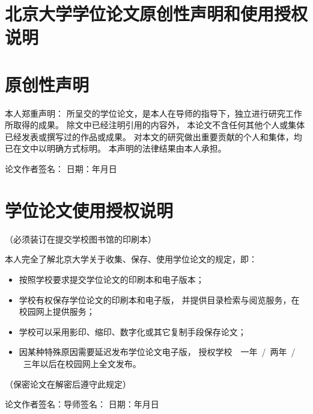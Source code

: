\cleardoublepage
\section*{北京大学学位论文原创性声明和使用授权说明}
\vfill

\section*{原创性声明}

本人郑重声明：
所呈交的学位论文，是本人在导师的指导下，独立进行研究工作所取得的成果。
除文中已经注明引用的内容外，
本论文不含任何其他个人或集体已经发表或撰写过的作品或成果。
对本文的研究做出重要贡献的个人和集体，均已在文中以明确方式标明。
本声明的法律结果由本人承担。
\vspace{2.5em}\par

\rightline
{%
	论文作者签名：\hspace{5em}%
	日期：\hspace{2em}年\hspace{2em}月\hspace{2em}日%
}
\vfill

\section*{学位论文使用授权说明}
\vspace{-1em}\par
\centerline{（必须装订在提交学校图书馆的印刷本）}
\vspace{1em}\par

本人完全了解北京大学关于收集、保存、使用学位论文的规定，即：
\begin{itemize}\denseenum
	\item 按照学校要求提交学位论文的印刷本和电子版本；
	\item 学校有权保存学位论文的印刷本和电子版，
		并提供目录检索与阅览服务，在校园网上提供服务；
	\item 学校可以采用影印、缩印、数字化或其它复制手段保存论文；
	\item 因某种特殊原因需要延迟发布学位论文电子版，
		授权学校~\Square~一年~/\Square~两年~/\\
		\Square~三年以后在校园网上全文发布。
\end{itemize}
\par（保密论文在解密后遵守此规定）
\vspace{2.5em}\par

\rightline
{%
	论文作者签名：\hspace{5em}导师签名：\hspace{5em}%
	日期：\hspace{2em}年\hspace{2em}月\hspace{2em}日%
}

